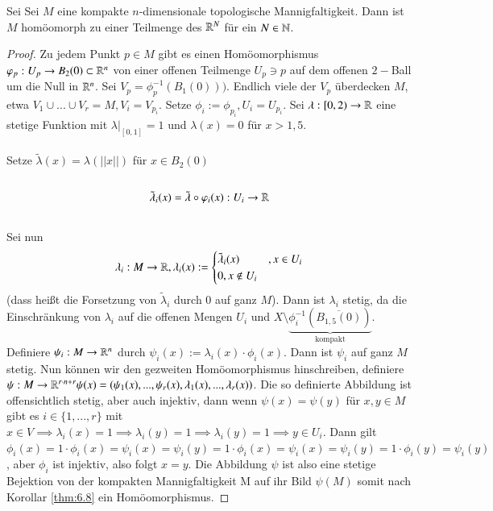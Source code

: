 \documentclass[a4paper,10pt]{scrartcl}
\begin{document}
\begin{st}
 Sei Sei $M$ eine kompakte $n$-dimensionale topologische Mannigfaltigkeit. Dann ist $M$ homöomorph zu einer Teilmenge des $\mathbb{R}^N$ für ein $N\in \mathbb{N}$.
\end{st}
\fixme[fig36]
\begin{proof}
 Zu jedem Punkt $p\in M$ gibt es einen Homöomorphismus $\varphi_p: U_p\to B_2(0) \subset \mathbb{R}^n$ von einer offenen Teilmenge $U_p\ni p$ auf dem offenen $2-$Ball um die Null in $\mathbb{R}^n$. Sei $V_p=\phi_p^{-1}(B_1(0)))$. Endlich viele der $V_p$ überdecken $M$, etwa $V_1 \cup ... \cup V_r=M, V_i=V_{p_i}$. Setze $\phi_i:=\phi_{p_i}, U_i=U_{p_i}$. Sei $\lambda:[0,2)\to \mathbb{R}$ eine stetige Funktion mit $\lambda|_{[0,1]}=1$ und $\lambda(x)=0$ für $x>1,5$.\\
\fixme[fig37]\\
Setze $\tilde \lambda(x)=\lambda(||x||)$ für $x\in B_2(0)$\\
\fixme[fig38]\\
\[
 \tilde \lambda_i(x)=\tilde\lambda \circ \varphi_i(x): U_i\to \mathbb{R}
\]
\fixme[fig39]\\
Sei nun 
\[
 \lambda_i: M \to \mathbb{R}, \lambda_i(x):=\begin{cases} \tilde \lambda_i(x)&, x\in U_i\\ 0, x\notin U_i \end{cases}
\]
(dass heißt die Forsetzung von $\tilde\lambda_i$ durch $0$ auf ganz $M$). Dann ist $\lambda_i$ stetig, da die Einschränkung von $\lambda_i$ auf die offenen Mengen $U_i$ und $X\setminus \underbrace{\phi_i^{-1}(\overline{B_{1,5}(0)})}_{\text{kompakt}}$. Definiere $\psi_i: M\to \mathbb{R}^n$ durch $\psi_i(x):= \lambda_i(x)\cdot \phi_i(x)$. Dann ist $\psi_i$ auf ganz $M$stetig.  Nun können wir den gezweiten Homöomorphismus hinschreiben, definiere $\psi: M\to \mathbb{R}^{r\cdot n+r} \psi(x)=(\psi_1(x),..., \psi_r(x), \lambda_1(x),..., \lambda_r(x))$. Die so definierte Abbildung ist offensichtlich stetig, aber auch injektiv, dann wenn $\psi(x)=\psi(y)$ für $x,y\in M$ gibt es $i\in \{1,..., r\}$ mit $x\in V \implies \lambda_i(x)=1 \implies \lambda_i(y)=1 \implies \lambda_i(y)=1\implies y \in U_i$. Dann gilt $\phi_i(x)=1\cdot \phi_i(x)=\psi_i(x)=\psi_i(y)=1\cdot \phi_i(x)=\psi_i(x)=\psi_i(y)=1\cdot \phi_i(y)=\psi_i(y)$, aber $\phi_i$ ist injektiv, also folgt $x=y$. Die Abbildung $\psi$ ist also eine stetige Bejektion von der kompakten Mannigfaltigkeit M auf ihr Bild $\psi(M)$ somit nach Korollar \ref{thm:6.8} ein Homöomorphismus.
\end{proof}
\end{document}

